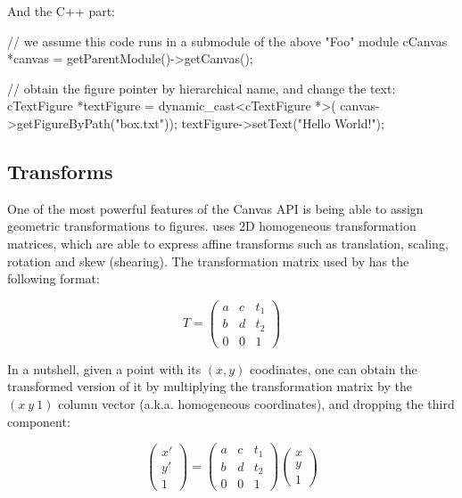 And the C++ part:

\begin{cpp}
// we assume this code runs in a submodule of the above "Foo" module
cCanvas *canvas = getParentModule()->getCanvas();

// obtain the figure pointer by hierarchical name, and change the text:
cTextFigure *textFigure = dynamic_cast<cTextFigure *>(
                              canvas->getFigureByPath("box.txt"));
textFigure->setText("Hello World!");
\end{cpp}





\subsection{Transforms}

One of the most powerful features of the Canvas API is being able to assign
geometric transformations to figures. {\opp} uses 2D homogeneous
transformation matrices, which are able to express affine transforms such
as translation, scaling, rotation and skew (shearing). The
transformation matrix used by {\opp} has the following format:

\[ T = \left( \begin{array}{ccc}
a & c & t_1 \\
b & d & t_2 \\
0 & 0 & 1 \end{array} \right)\]

In a nutshell, given a point with its $(x, y)$ coodinates, one can obtain the
transformed version of it by multiplying the transformation matrix by the
$(x \ y \ 1)$ column vector (a.k.a. homogeneous coordinates), and dropping the
third component:

\[ \left( \begin{array}{c} x' \\ y' \\ 1 \end{array} \right)
 = \left( \begin{array}{ccc}
a & c & t_1 \\
b & d & t_2 \\
0 & 0 & 1 \end{array} \right)
\left( \begin{array}{c} x \\ y \\ 1 \end{array} \right)
\]

